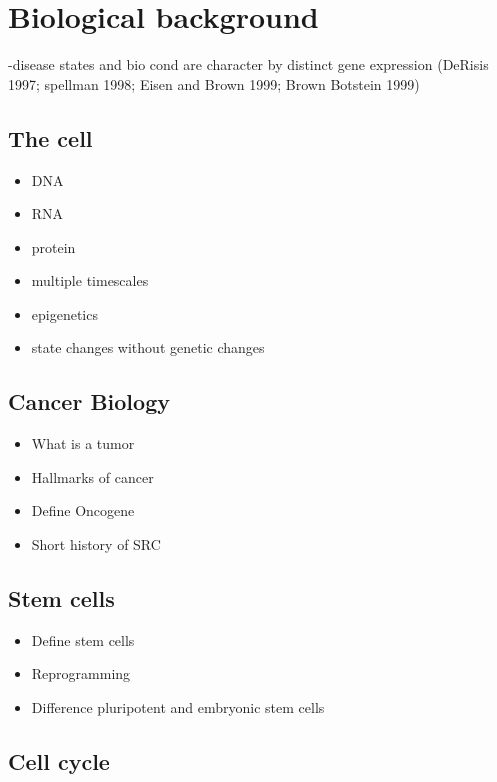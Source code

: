 \section{Biological background}
\label{sec:biol-backgr}

-disease states and bio cond are character by distinct gene expression (DeRisis 1997; spellman 1998; Eisen and Brown
1999; Brown Botstein 1999)

\subsection{The cell}
\label{sec:cell}

\begin{itemize}
\item DNA
\item RNA
\item protein
\item multiple timescales
\item epigenetics
\item state changes without genetic changes
\end{itemize}

\subsection{Cancer Biology}
\label{sec:cancer-biology}

\begin{itemize}
\item What is a tumor
\item Hallmarks of cancer
\item Define Oncogene
\item Short history of SRC
\end{itemize}

\subsection{Stem cells}
\label{sec:stem-cells}

\begin{itemize}
\item Define stem cells
\item Reprogramming
\item Difference pluripotent and embryonic stem cells
\end{itemize}

\subsection{Cell cycle}
\label{sec:cell-cycle}


